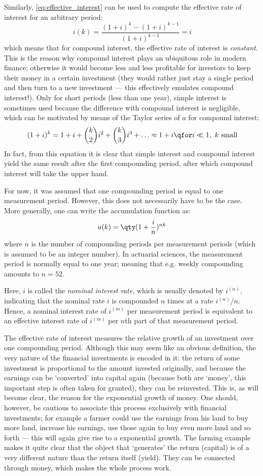 Similarly, \cref{eq:effective_interest} can be used to compute the effective rate of interest for an arbitrary period:
\[
     i(k) = \frac{(1 + i)^k - (1 + i)^{k-1}}{(1 + i)^{k-1}} = i
\]
which means that for compound interest, the effective rate of interest is \emph{constant}. This is the reason why compound interest plays an ubiquitous role in modern finance; otherwise it would become less and less profitable for investors to keep  their money in a certain investment (they would rather just stay a single period and then turn to a new investment --- this effectively emulates compound interest!). Only for short periods (less than one year), simple interest is sometimes used because the difference with compound interest is negligible, which can be motivated by means of the Taylor series of \(a\) for compound interest: 
\[
     (1 + i)^k = 1 + i +  \binom{k}{2}i^2 + \binom{k}{3}i^3 + \ldots \approx 1 + i\qfor i \ll 1,\ k \text{ small}
\]
In fact, from this equation it is clear that simple interest and compound interest yield the same result after the first compounding period, after which compound interest will take the upper hand.

For now, it was assumed that one compounding period is equal to one measurement period. However, this does not necessarily have to be the case. More generally, one can write the accumulation function as:
\[
     a(k) = \qty(1 + \frac{i}{n})^{nk}
\]
where \(n\) is the number of compounding periods per measurement periods (which is assumed to be an integer number). In actuarial sciences, the measurement period is normally equal to one year; meaning that e.g. weekly compounding amounts to \(n = 52\).

Here, \(i\) is called the \emph{nominal interest rate}, which is usually denoted by \(i^{(n)}\), indicating that the nominal rate \(i\) is compounded \(n\) times at a rate \(i^{(n)}/n\). Hence, a nominal interest rate of \(i^{(m)}\) per measurement period is equivalent to an effective interest rate of \( i^{(m)}\) per \(n\)th part of that measurement period. 

The effective rate of interest measures the relative growth of an investment over one compounding period. Although this may seem like an obvious definition, the very nature of the financial investments is encoded in it: the return of some investment is proportional to the amount invested originally, and because the earnings can be `converted' into capital again (because both are `money', this important step is often taken for granted), they can be reinvested. This is, as will become clear, the reason for the exponential growth of money. One should, however, be cautious to associate this process exclusively with financial investments; for example a farmer could use the earnings from his land to buy more land, increase his earnings, use those again to buy even more land and so forth --- this will again give rise to a exponential growth. The farming example makes it quite clear that the object that `generates' the return (capital) is of a very different nature than the return itself (yield). They can be connected through money, which makes the whole process work. 

